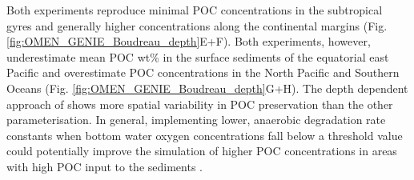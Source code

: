 \documentclass[gmd, manuscript]{copernicus}
\begin{document}
Both experiments reproduce minimal POC concentrations in the subtropical gyres and generally higher concentrations along the continental margins (Fig. \ref{fig:OMEN_GENIE_Boudreau_depth}E+F). 
Both experiments, however, underestimate mean POC wt\% in the surface sediments of the equatorial east Pacific and overestimate POC concentrations 
in the North Pacific and Southern Oceans (Fig. \ref{fig:OMEN_GENIE_Boudreau_depth}G+H). 
The depth dependent approach of \citet{boudreau1997diagenetic} shows more spatial variability in POC preservation than the other parameterisation. 
In general, implementing lower, anaerobic degradation rate constants when bottom water oxygen concentrations fall below a threshold value could potentially improve the simulation of higher POC concentrations in areas with high POC input to the 
sediments \citep{palastanga_long_term_2011}. 



% 

\end{document}
